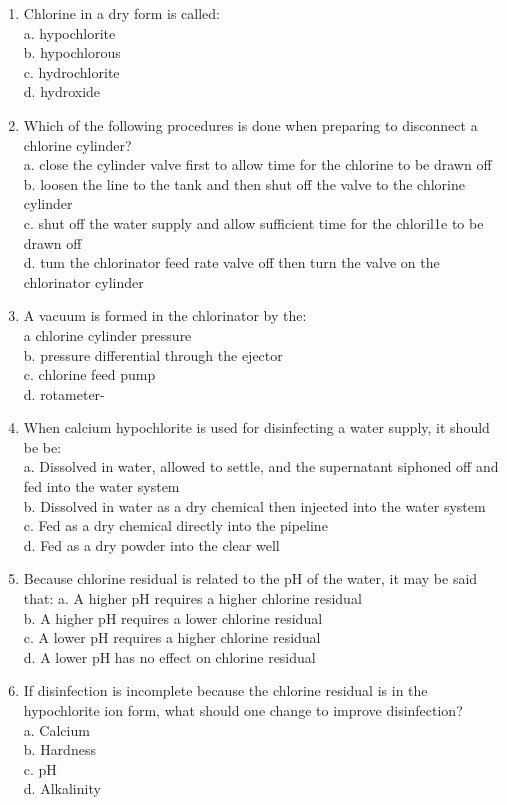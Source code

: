 \documentclass{article}
\begin{document}
\begin{enumerate}
\item Chlorine in a dry form is called:\\
a.	hypochlorite\\
b.	hypochlorous\\
c.	hydrochlorite\\
d.	hydroxide\\

\item Which of the following procedures is done when preparing to disconnect a chlorine cylinder?\\
a.	close the cylinder valve first to allow time for the chlorine to be drawn off\\
b.	loosen the line to the tank and then shut off the valve to the chlorine cylinder\\
c.	shut off the water supply and allow sufficient time for the chloril1e to be drawn off\\
d.	tum the chlorinator feed rate valve off then turn the valve on the chlorinator cylinder\\


\item A vacuum is formed in the chlorinator by the:\\
a	chlorine cylinder pressure\\
b.	pressure differential through the ejector\\
c.	chlorine feed pump\\
d.	rotameter-\\

\item When calcium hypochlorite is used for disinfecting a water supply, it should be be:\\
a. Dissolved in water, allowed to settle, and the supernatant siphoned off and fed into the water system\\
b. Dissolved in water as a dry chemical then injected into the water system\\
c. Fed as a dry chemical directly into the pipeline\\
d. Fed as a dry powder into the clear well\\

\item Because chlorine residual is related to the pH of the water, it may be said that:
a. A higher pH requires a higher chlorine residual\\
b. A higher pH requires a lower chlorine residual\\
c. A lower pH requires a higher chlorine residual\\
d. A lower pH has no effect on chlorine residual\\

\item If disinfection is incomplete because the chlorine residual is in the hypochlorite ion form, what should one change to improve disinfection?\\
a. Calcium\\
b. Hardness\\
c. pH\\
d. Alkalinity
\end{enumerate}
\newpage
\end{document}
